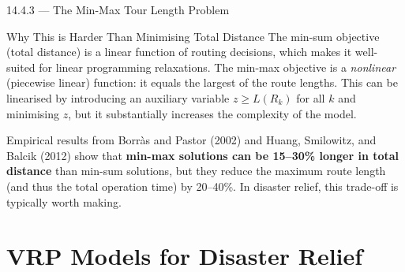 \documentclass[aspectratio=169,10pt]{beamer}
\begin{document}
\begin{frame}[allowframebreaks]{14.4.3 --- The Min-Max Tour Length Problem}
  \begin{alertblock}{Why This is Harder Than Minimising Total Distance}
    The min-sum objective (total distance) is a linear function of
    routing decisions, which makes it well-suited for linear programming
    relaxations.
    The min-max objective is a \emph{nonlinear} (piecewise linear)
    function: it equals the largest of the route lengths.
    This can be linearised by introducing an auxiliary variable
    $z \geq L(R_k)$ for all $k$ and minimising $z$, but it substantially
    increases the complexity of the model.
  \end{alertblock}

  \medskip
  Empirical results from Borr\`as and Pastor (2002) and
  Huang, Smilowitz, and Balcik (2012) show that
  \textbf{min-max solutions can be 15--30\% longer in total distance}
  than min-sum solutions, but they reduce the maximum route length
  (and thus the total operation time) by 20--40\%.
  In disaster relief, this trade-off is typically worth making.
\end{frame}

\section{VRP Models for Disaster Relief}
\end{document}
